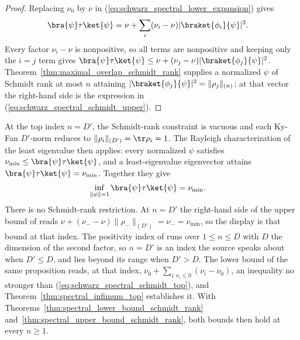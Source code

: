 \begin{proof}
    \leanok
    Replacing $\nu_0$ by $\nu$ in
    (\ref{eq:schwarz_spectral_lower_expansion}) gives
    \begin{align}
        \bra{\psi}\tau\ket{\psi}
         & =\nu+\sum_i(\nu_i-\nu)|\braket{\phi_i}{\psi}|^2.
        \notag
    \end{align}
    Every factor $\nu_i-\nu$ is nonpositive, so all terms are nonpositive and
    keeping only the $i=j$ term gives
    $\bra{\psi}\tau\ket{\psi}
        \le\nu+(\nu_j-\nu)|\braket{\phi_j}{\psi}|^2$.
    Theorem~\ref{thm:maximal_overlap_schmidt_rank} supplies a normalized
    $\psi$ of Schmidt rank at most $n$ attaining
    $|\braket{\phi_j}{\psi}|^2=\|\rho_j\|_{(n)}$; at that vector the
    right-hand side is the expression in
    (\ref{eq:schwarz_spectral_schmidt_upper}).
\end{proof}

\begin{theorem}
    \label{thm:spectral_bound_schmidt_rank_top}
    \leanok
    At the top index $n=D'$, the Schmidt-rank constraint is vacuous and each
    Ky-Fan $D'$-norm reduces to $\|\rho_i\|_{(D')}=\tr\rho_i=1$. The Rayleigh
    characterization of the least eigenvalue then applies: every normalized
    $\psi$ satisfies $\nu_{\min}\le\bra{\psi}\tau\ket{\psi}$, and a
    least-eigenvalue eigenvector attains
    $\bra{\psi}\tau\ket{\psi}=\nu_{\min}$. Together they give
    \begin{align}
        \inf_{\|\psi\|=1}\bra{\psi}\tau\ket{\psi}
         & =\nu_{\min}.
        \label{eq:schwarz_spectral_schmidt_top}
    \end{align}
    There is no Schmidt-rank restriction. At $n=D'$ the right-hand side of the
    upper bound of \cite[Chapter~3, Proposition~3.2]{Wolf2012Quantum} reads
    $\nu+(\nu_--\nu)\|\rho_-\|_{(D')}=\nu_-=\nu_{\min}$, so the display is that
    bound at that index. The positivity index of
    \cite[Chapter~3, Proposition~3.1]{Wolf2012Quantum} runs over $1\le n\le D$
    with $D$ the dimension of the second factor, so $n=D'$ is an index the
    source speaks about when $D'\le D$, and lies beyond its range when $D'>D$.
    The lower bound of the same proposition reads, at that index,
    $\nu_0+\sum_{i:\nu_i\le0}(\nu_i-\nu_0)$, an inequality no stronger than
    (\ref{eq:schwarz_spectral_schmidt_top}), and
    Theorem~\ref{thm:spectral_infimum_top} establishes it. With
    Theorems~\ref{thm:spectral_lower_bound_schmidt_rank}
    and~\ref{thm:spectral_upper_bound_schmidt_rank}, both bounds then hold at
    every $n\ge1$.
\end{theorem}

